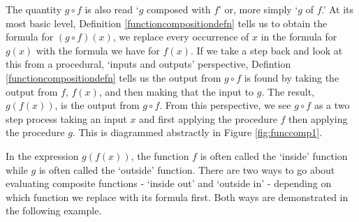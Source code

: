 
\smallskip


\smallskip

The quantity $g \circ f$ is also read `$g$ composed with $f$' or, more simply `$g$ of $f$.' At its most basic level, Definition \ref{functioncompositiondefn} tells us to obtain the formula for $\left(g \circ f\right)(x)$, we replace every occurrence of $x$ in the formula for $g(x)$ with the formula we have for $f(x)$.  If we take a step back and look at this from a procedural, `inputs and outputs' perspective, Defintion \ref{functioncompositiondefn} tells us  the output from $g \circ f$ is found by taking the output from $f$, $f(x)$,  and then making that the input to $g$.  The result, $g(f(x))$, is the output from $g \circ f$.  From this perspective, we see $g \circ f$ as a two step process taking an input $x$ and first applying the procedure $f$ then applying the procedure $g$.  This is diagrammed abstractly in Figure \ref{fig:funccomp1}.


In the expression $g(f(x))$, the function $f$ is often called the `inside' function while $g$ is often called the `outside' function.  There are two ways to go about evaluating composite functions - `inside out' and `outside in' - depending on which function we replace with its formula first.  Both ways are  demonstrated in the following example.  

\medskip



